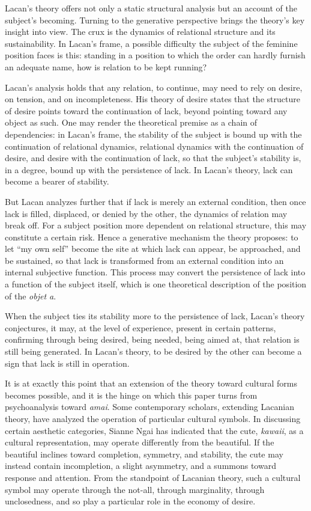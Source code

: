 \documentclass[11pt,a4paper]{article}
\begin{document}
Lacan's theory offers not only a static structural analysis but an account of the subject's becoming. Turning to the generative perspective brings the theory's key insight into view. The crux is the dynamics of relational structure and its sustainability. In Lacan's frame, a possible difficulty the subject of the feminine position faces is this: standing in a position to which the order can hardly furnish an adequate name, how is relation to be kept running?

Lacan's analysis holds that any relation, to continue, may need to rely on desire, on tension, and on incompleteness. His theory of desire states that the structure of desire points toward the continuation of lack, beyond pointing toward any object as such. One may render the theoretical premise as a chain of dependencies: in Lacan's frame, the stability of the subject is bound up with the continuation of relational dynamics, relational dynamics with the continuation of desire, and desire with the continuation of lack, so that the subject's stability is, in a degree, bound up with the persistence of lack. In Lacan's theory, lack can become a bearer of stability.

But Lacan analyzes further that if lack is merely an external condition, then once lack is filled, displaced, or denied by the other, the dynamics of relation may break off. For a subject position more dependent on relational structure, this may constitute a certain risk. Hence a generative mechanism the theory proposes: to let ``my own self'' become the site at which lack can appear, be approached, and be sustained, so that lack is transformed from an external condition into an internal subjective function. This process may convert the persistence of lack into a function of the subject itself, which is one theoretical description of the position of the \textit{objet a}.

When the subject ties its stability more to the persistence of lack, Lacan's theory conjectures, it may, at the level of experience, present in certain patterns, confirming through being desired, being needed, being aimed at, that relation is still being generated. In Lacan's theory, to be desired by the other can become a sign that lack is still in operation.

It is at exactly this point that an extension of the theory toward cultural forms becomes possible, and it is the hinge on which this paper turns from psychoanalysis toward \textit{amai}. Some contemporary scholars, extending Lacanian theory, have analyzed the operation of particular cultural symbols. In discussing certain aesthetic categories, Sianne Ngai has indicated that the cute, \textit{kawaii}, as a cultural representation, may operate differently from the beautiful. If the beautiful inclines toward completion, symmetry, and stability, the cute may instead contain incompletion, a slight asymmetry, and a summons toward response and attention. From the standpoint of Lacanian theory, such a cultural symbol may operate through the not-all, through marginality, through unclosedness, and so play a particular role in the economy of desire.
\end{document}
